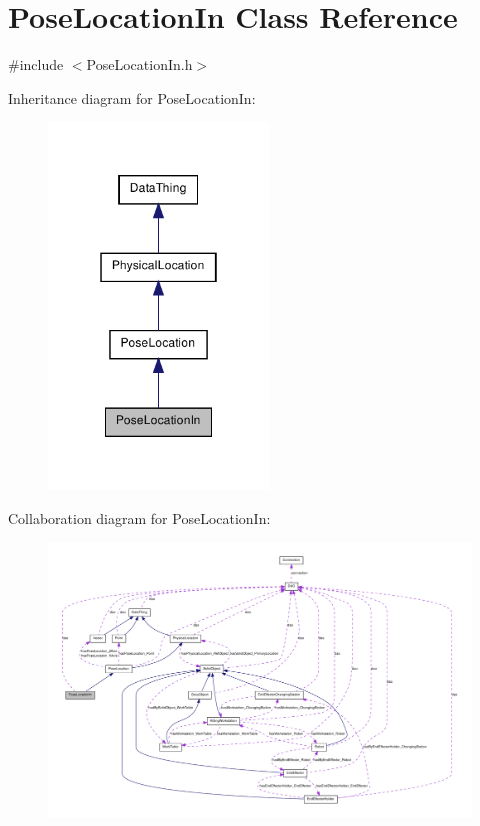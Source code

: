 \hypertarget{class_pose_location_in}{
\section{PoseLocationIn Class Reference}
\label{class_pose_location_in}
}


{\ttfamily \#include $<$PoseLocationIn.h$>$}



Inheritance diagram for PoseLocationIn:\nopagebreak
\begin{figure}[H]
\begin{center}
\leavevmode
\includegraphics[width=166pt]{class_pose_location_in__inherit__graph}
\end{center}
\end{figure}


Collaboration diagram for PoseLocationIn:\nopagebreak
\begin{figure}[H]
\begin{center}
\leavevmode
\includegraphics[width=400pt]{class_pose_location_in__coll__graph}
\end{center}
\end{figure}
